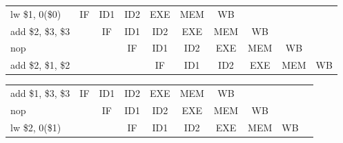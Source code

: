 \documentclass[pdftex,12pt,a4paper]{report}
\begin{document}
\begin{table}[!htb]
\centering
\label{my-label}
\begin{tabular}{lccc|c|c|c|ccc}
\cline{2-7}
\multicolumn{1}{l|}{lw \$1, 0(\$0)} & \multicolumn{1}{c|}{IF} & \multicolumn{1}{c|}{ID1} & ID2 & EXE & \cellcolor[HTML]{F8A102}MEM & \cellcolor[HTML]{FFCC67}WB  &                          &                          &                         \\ \cline{2-8}
add \$2, \$3, \$3                   & \multicolumn{1}{c|}{}   & \multicolumn{1}{c|}{IF}  & ID1 & ID2 & EXE & MEM & \multicolumn{1}{c|}{WB}  &                          &                         \\ \cline{3-9}
nop                               &                         & \multicolumn{1}{c|}{}    & IF  & ID1 & ID2                         & EXE                         & \multicolumn{1}{c|}{MEM} & \multicolumn{1}{c|}{WB}  &                         \\ \cline{4-10} 
add \$2, \$1, \$2                   &                         &                          &     & IF  & ID1                         & \cellcolor[HTML]{F8A102}ID2 & \multicolumn{1}{c|}{EXE} & \multicolumn{1}{c|}{MEM} & \multicolumn{1}{c|}{WB} \\ \cline{5-10} 
\end{tabular}
\end{table}

\begin{table}[!htb]
\centering
\label{my-label}
\begin{tabular}{lcc|c|c|c|c|ccc}
\cline{2-7}
\multicolumn{1}{l|}{add \$1, \$3, \$3} & \multicolumn{1}{c|}{IF} & ID1 & ID2 & \cellcolor[HTML]{F8A102}EXE & \cellcolor[HTML]{FFCC67}MEM & WB  &                          &                         &  \\ \cline{2-8}
nop                                  & \multicolumn{1}{c|}{}   & IF  & ID1 & ID2                         & EXE                         & MEM & \multicolumn{1}{c|}{WB}  &                         &  \\ \cline{3-9}
lw \$2, 0(\$1)                         &                         &     & IF  & ID1                         & \cellcolor[HTML]{F8A102}ID2 & EXE & \multicolumn{1}{c|}{MEM} & \multicolumn{1}{c|}{WB} &  \\ \cline{4-9}
\end{tabular}
\end{table}
\end{document}
